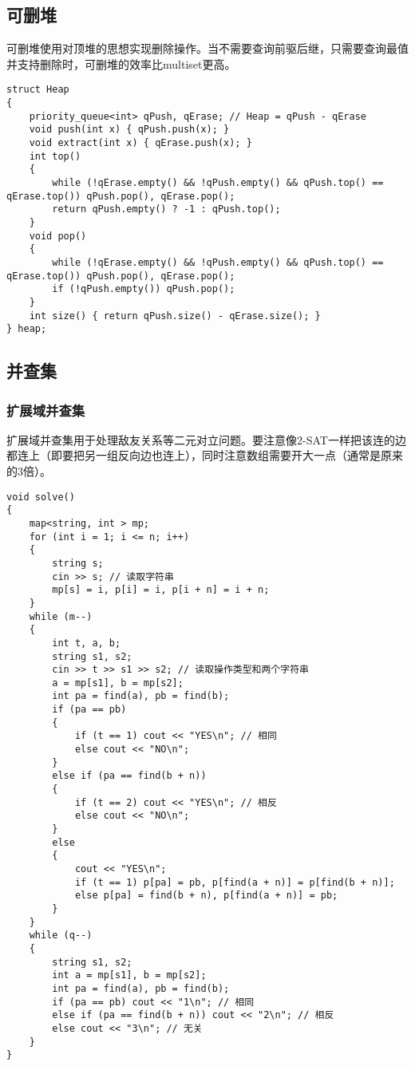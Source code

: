\documentclass[a4paper, fontset=none]{ctexart}
\begin{document}
\subsection{可删堆}

可删堆使用对顶堆的思想实现删除操作。当不需要查询前驱后继，只需要查询最值并支持删除时，可删堆的效率比multiset更高。
\begin{verbatim}
struct Heap
{
    priority_queue<int> qPush, qErase; // Heap = qPush - qErase
    void push(int x) { qPush.push(x); }
    void extract(int x) { qErase.push(x); }
    int top()
    {
        while (!qErase.empty() && !qPush.empty() && qPush.top() == qErase.top()) qPush.pop(), qErase.pop();
        return qPush.empty() ? -1 : qPush.top();
    }
    void pop()
    {
        while (!qErase.empty() && !qPush.empty() && qPush.top() == qErase.top()) qPush.pop(), qErase.pop();
        if (!qPush.empty()) qPush.pop();
    }
    int size() { return qPush.size() - qErase.size(); }
} heap;
\end{verbatim}
\subsection{并查集}
\subsubsection{扩展域并查集}
扩展域并查集用于处理敌友关系等二元对立问题。要注意像2-SAT一样把该连的边都连上（即要把另一组反向边也连上），同时注意数组需要开大一点（通常是原来的3倍）。
\begin{verbatim}
void solve()
{
    map<string, int > mp;
    for (int i = 1; i <= n; i++)
    {
        string s;
        cin >> s; // 读取字符串
        mp[s] = i, p[i] = i, p[i + n] = i + n;
    }
    while (m--)
    {
        int t, a, b;
        string s1, s2;
        cin >> t >> s1 >> s2; // 读取操作类型和两个字符串
        a = mp[s1], b = mp[s2];
        int pa = find(a), pb = find(b);
        if (pa == pb)
        {
            if (t == 1) cout << "YES\n"; // 相同
            else cout << "NO\n";
        }
        else if (pa == find(b + n))
        {
            if (t == 2) cout << "YES\n"; // 相反
            else cout << "NO\n";
        }
        else
        {
            cout << "YES\n";
            if (t == 1) p[pa] = pb, p[find(a + n)] = p[find(b + n)];
            else p[pa] = find(b + n), p[find(a + n)] = pb;
        }
    }
    while (q--)
    {
        string s1, s2;
        int a = mp[s1], b = mp[s2];
        int pa = find(a), pb = find(b);
        if (pa == pb) cout << "1\n"; // 相同
        else if (pa == find(b + n)) cout << "2\n"; // 相反
        else cout << "3\n"; // 无关
    }
}
\end{verbatim}
\end{document}
